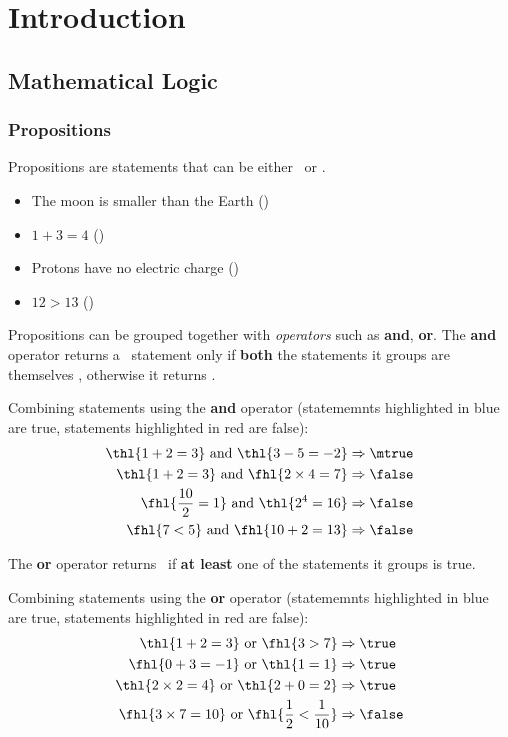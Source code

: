 \chapter{Introduction}

\section{Mathematical Logic}
\subsection{Propositions}
Propositions are statements that can be either \true\ or \false.
\begin{example}
  \begin{itemize}
  \item The moon is smaller than the Earth (\true)
  \item $1+3=4$ (\true)
  \item Protons have no electric charge (\false)
  \item $12 > 13$ (\false)
  \end{itemize}
\end{example}

Propositions can be grouped together with \emph{operators} such as \textbf{and}, \textbf{or}. The \textbf{and} operator returns a \true\ statement only if \textbf{both} the statements it groups are themselves \true, otherwise it returns \false.
\begin{example}
  Combining statements using the \textbf{and} operator (statememnts highlighted in \colorbox{col2!50}{blue} are true, statements highlighted in \colorbox{col1!50}{red} are false):
  \begin{align*}
  \thl{1+2=3} \text{ and } \thl{3-5=-2} &\Rightarrow \mtrue\\
  \thl{1+2=3} \text{ and } \fhl{2\times4=7} &\Rightarrow \false\\
  \fhl{\frac{10}{2}=1} \text{ and } \thl{2^{4}=16} &\Rightarrow \false\\
  \fhl{7<5} \text{ and } \fhl{10+2=13} &\Rightarrow \false\\
  \end{align*}
\end{example}

The \textbf{or} operator returns \true\ if \textbf{at least} one of the statements it groups is true.
\begin{example}
  Combining statements using the \textbf{or} operator (statememnts highlighted in \colorbox{col2!50}{blue} are true, statements highlighted in \colorbox{col1!50}{red} are false):
  \begin{align*}
  \thl{1+2=3} \text{ or } \fhl{3>7} &\Rightarrow \true\\
  \fhl{0+3=-1} \text{ or } \thl{1=1} &\Rightarrow \true\\
  \thl{2\times2=4} \text{ or } \thl{2+0=2} &\Rightarrow \true\\
  \fhl{3\times7=10} \text{ or } \fhl{\frac{1}{2}<\frac{1}{10}} &\Rightarrow \false\\
  \end{align*}
\end{example}

